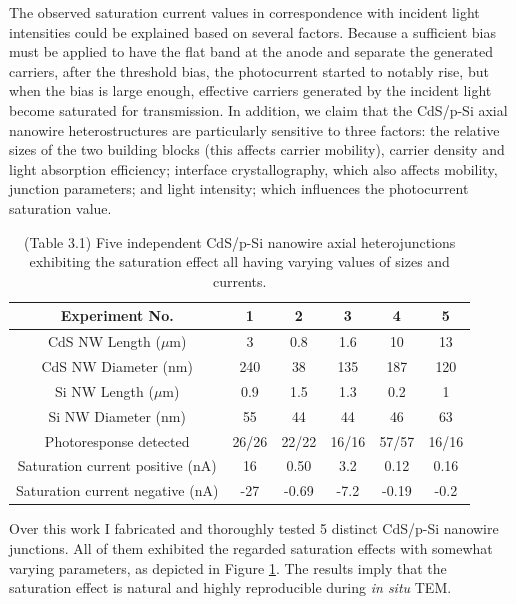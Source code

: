 The observed saturation current values in correspondence with incident light intensities could be explained based on several factors. Because a sufficient bias must be applied to have the flat band at the anode and separate the generated carriers, after the threshold bias, the photocurrent started to notably rise, but when the bias is large enough, effective carriers generated by the incident light become saturated for transmission. In addition, we claim that the CdS/p-Si axial nanowire heterostructures are particularly sensitive to three factors: the relative sizes of the two building blocks (this affects carrier mobility), carrier density and light absorption efficiency; interface crystallography, which also affects mobility, junction parameters; and light intensity; which influences the photocurrent saturation value. 

\begin{table}[ht]
\centering
\begin{tabular}{|c|c|c|c|c|c|}
\hline
Experiment No. & 1 & 2 & 3 & 4 & 5\\
\hline
CdS NW Length ($\mu$m) & 3 & 0.8 & 1.6 & 10 & 13\\
CdS NW Diameter (nm) & 240 & 38 & 135 & 187 & 120\\
Si NW Length ($\mu$m) & 0.9 & 1.5 & 1.3 & 0.2 & 1\\
Si NW Diameter (nm) & 55 & 44 & 44 & 46 & 63\\
Photoresponse detected & 26/26 & 22/22 & 16/16 & 57/57 & 16/16\\
Saturation current positive (nA) & 16 & 0.50 & 3.2 & 0.12 & 0.16\\
Saturation current negative (nA) & -27 & -0.69 & -7.2 & -0.19 & -0.2\\
\hline
\end{tabular}
\caption[Reproducibility of the saturation effect]{(Table 3.1) Five independent CdS/p-Si nanowire axial heterojunctions exhibiting the saturation effect all having varying values of sizes and currents. 
\label{table:3_1}}
\end{table}

Over this work I fabricated and thoroughly tested 5 distinct CdS/p-Si nanowire junctions. All of them exhibited the regarded saturation effects with somewhat varying parameters, as depicted in Figure \ref{table:3_1}. The results imply that the saturation effect is natural and highly reproducible during \emph{in situ} TEM. 

